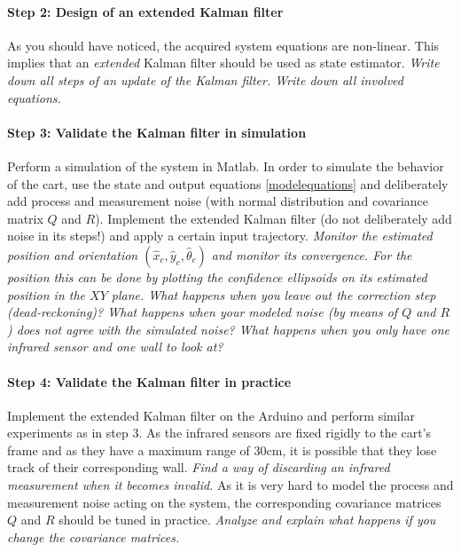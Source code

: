 \documentclass[10pt,a4paper]{article}
\begin{document}
\paragraph{Step 2: Design of an extended Kalman filter}
As you should have noticed, the acquired system equations are non-linear. This implies that an \textit{extended} Kalman filter should be used as state estimator. \textit{Write down all steps of an update of the Kalman filter. Write down all involved equations.}

\paragraph{Step 3: Validate the Kalman filter in simulation}
Perform a simulation of the system in Matlab. In order to simulate the behavior of the cart, use the state and output equations \eqref{modelequations} and deliberately add process and measurement noise (with normal distribution and covariance matrix $Q$ and $R$). Implement the extended Kalman filter (do not deliberately add noise in its steps!) and apply a certain input trajectory. \textit{Monitor the estimated position and orientation $(\hat{x}_c, \hat{y}_c, \hat{\theta}_c)$ and monitor its convergence. For the position this can be done by plotting the confidence ellipsoids on its estimated position in the $XY$ plane. What happens when you leave out the correction step (dead-reckoning)? What happens when your modeled noise (by means of $Q$ and $R$) does not agree with the simulated noise? What happens when you only have one infrared sensor and one wall to look at?}

\paragraph{Step 4: Validate the Kalman filter in practice}
Implement the extended Kalman filter on the Arduino and perform similar experiments as in step 3. As the infrared sensors are fixed rigidly to the cart's frame and as they have a maximum range of 30cm, it is possible that they lose track of their corresponding wall. \textit{Find a way of discarding an infrared measurement when it becomes invalid.} As it is very hard to model the process and measurement noise acting on the system, the corresponding covariance matrices $Q$ and $R$ should be tuned in practice. \textit{Analyze and explain what happens if you change the covariance matrices.}
\end{document}
